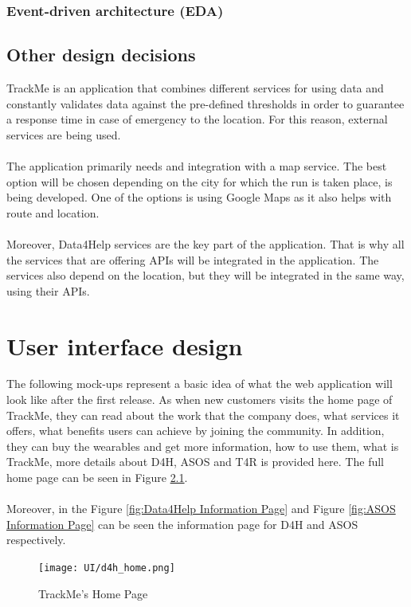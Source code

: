 \documentclass[a4paper, hidelinks, 12pt]{report}
\begin{document}
	\subsection{Event-driven architecture (EDA)}

	\section{Other design decisions}
	TrackMe is an application that combines different services for using data and constantly validates data against the pre-defined thresholds in order to guarantee a response time in case of emergency to the location. For this reason, external services are being used.\\\\
The application primarily needs and integration with a map service. The best option will be chosen depending on the city for which the run is taken place, is being developed. One of the options is using Google Maps as it also helps with route and location.\\\\
Moreover, Data4Help services are the key part of the   application. That is why all the services that are offering APIs will be integrated in the application. The services also depend on the location, but they will be integrated in the same way, using their APIs.
	
	\chapter{User interface design}
	The following mock-ups represent a basic idea of what the web application will look like after the first release.
	As when new customers visits the home page of TrackMe, they can read about the work that the company does, what services it offers, what benefits users can achieve by joining the community. In addition, they can buy the wearables and get more information, how to use them, what is TrackMe, more details about D4H, ASOS and T4R is provided here. The full home page can be seen in Figure \ref{fig:Home_Page}. \\\\
	Moreover, in the Figure \ref{fig:Data4Help Information Page} and Figure \ref{fig:ASOS Information Page} can be seen the information page for D4H and ASOS respectively.
	
	\begin{figure}[H]
		\centering
		\texttt{[image: UI/d4h\_home.png]}
		\caption[UI: TrackMe's Home Page]{TrackMe's Home Page}
		\label{fig:Home_Page}
	\end{figure}
	
\end{document}
